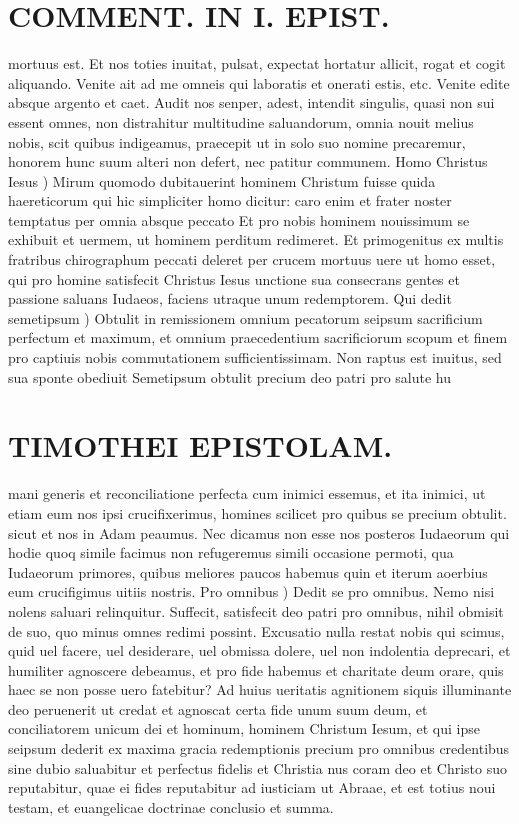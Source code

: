 \documentclass{article}
\begin{document}
\begin{pages}
\section*{COMMENT. IN I. EPIST. }
\marginpar{[ p.50 ]}\pstart mortuus est. Et nos toties inuitat, pulsat, expectat hortatur allicit, rogat et cogit aliquando. Venite ait ad me omneis qui laboratis et onerati estis, etc. Venite edite absque argento et caet. Audit nos senper, adest, intendit singulis, quasi non sui essent omnes, non distrahitur multitudine saluandorum, omnia nouit melius nobis, scit quibus indigeamus, praecepit ut in solo suo nomine precaremur, honorem hunc suum alteri non defert, nec patitur communem.  \pend\pstart Homo Christus Iesus ) Mirum quomodo dubitauerint hominem Christum fuisse quida haereticorum qui hic simpliciter homo dicitur: caro enim et frater noster temptatus per omnia absque peccato Et pro nobis hominem nouissimum se exhibuit et uermem, ut hominem perditum redimeret. Et primogenitus ex multis fratribus chirographum peccati deleret per crucem mortuus uere ut homo esset, qui pro homine satisfecit Christus Iesus unctione sua consecrans gentes et passione saluans Iudaeos, faciens utraque unum redemptorem.  \pend\pstart Qui dedit semetipsum ) Obtulit in remissionem omnium pecatorum seipsum sacrificium perfectum et maximum, et omnium praecedentium sacrificiorum scopum et finem pro captiuis nobis commutationem sufficientissimam. Non raptus est inuitus, sed sua sponte obediuit Semetipsum obtulit precium deo patri pro salute hu\pend
\section*{TIMOTHEI EPISTOLAM. }
\marginpar{[ p.51 ]}\pstart mani generis et reconciliatione perfecta cum inimici essemus, et ita inimici, ut etiam eum nos ipsi crucifixerimus, homines scilicet pro quibus se precium obtulit. sicut et nos in Adam peaumus. Nec dicamus non esse nos posteros Iudaeorum qui hodie quoq simile facimus non refugeremus simili occasione permoti, qua Iudaeorum primores, quibus meliores paucos habemus quin et iterum aoerbius eum crucifigimus uitiis nostris.  \pend\pstart Pro omnibus ) Dedit se pro omnibus. Nemo nisi nolens saluari relinquitur. Suffecit, satisfecit deo patri pro omnibus, nihil obmisit de suo, quo minus omnes redimi possint. Excusatio nulla restat nobis qui scimus, quid uel facere, uel desiderare, uel obmissa dolere, uel non indolentia deprecari, et humiliter agnoscere debeamus, et pro fide habemus et charitate deum orare, quis haec se non posse uero fatebitur? Ad huius ueritatis agnitionem siquis illuminante deo peruenerit ut credat et agnoscat certa fide unum suum deum, et conciliatorem unicum dei et hominum, hominem Christum Iesum, et qui ipse seipsum dederit ex maxima gracia redemptionis precium pro omnibus credentibus sine dubio saluabitur et perfectus fidelis et Christia nus coram deo et Christo suo reputabitur, quae ei fides reputabitur ad iusticiam ut Abraae, et est totius noui testam, et euangelicae doctrinae conclusio et summa.  \pend

\end{pages}
\end{document}
